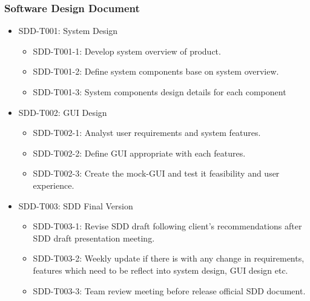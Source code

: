 \documentclass[11pt, a4paper]{article}
\begin{document}
		\subsubsection{Software Design Document}
		\begin{itemize}
				\item SDD-T001: System Design
				\begin{itemize}
					\item SDD-T001-1: Develop system overview of product.
					\item SDD-T001-2: Define system components base on system overview.
					\item SDD-T001-3: System components design details for each component
				\end{itemize}
				\item SDD-T002: GUI Design
				\begin{itemize}
					\item SDD-T002-1: Analyst user requirements and system features.
					\item SDD-T002-2: Define GUI appropriate with each features.
					\item SDD-T002-3: Create the mock-GUI and test it feasibility and user experience.
				\end{itemize}
				\item SDD-T003: SDD Final Version
				\begin{itemize}
					\item  SDD-T003-1: Revise SDD draft following client's recommendations after SDD draft presentation meeting.
					\item  SDD-T003-2: Weekly update if there is with any change in requirements, features which need to be reflect into system design, GUI design etc.
					\item  SDD-T003-3: Team review meeting before release official SDD document.
				\end{itemize}
		\end{itemize}
	
\end{document}
